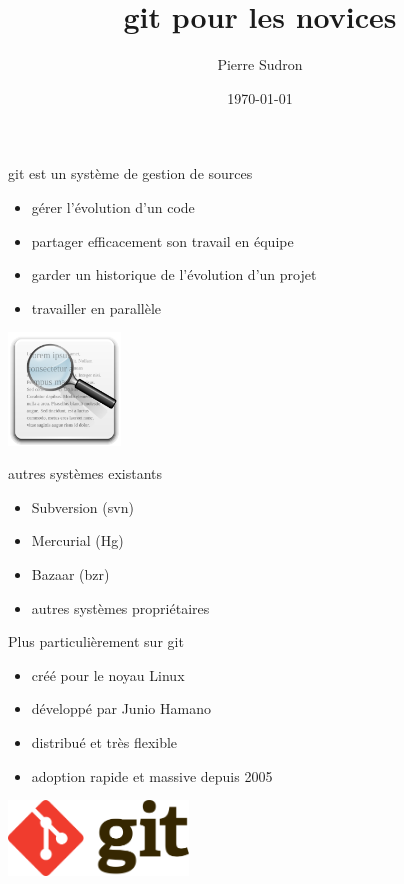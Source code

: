 \documentclass{beamer}
\author{Pierre Sudron}
\title{{\huge git pour les novices}}
\institute{EISTI}
\date{\today}
\begin{document}
\begin{frame}[t,plain]
\titlepage
\end{frame}

\begin{frame}{git est un système de gestion de sources}
	\begin{itemize}
		\item gérer l'évolution d'un code
		\item partager efficacement son travail en équipe
		\item garder un historique de l'évolution d'un projet
		\item travailler en parallèle
	\end{itemize}
	\begin{center}
		\includegraphics[width=3cm]{img/search}
	\end{center}
\end{frame}

\begin{frame}{autres systèmes existants}
	\begin{itemize}
		\item Subversion (svn)
		\item Mercurial (Hg)
		\item Bazaar (bzr)
		\item autres systèmes propriétaires
	\end{itemize}
\end{frame}

\begin{frame}{Plus particulièrement sur git}
	\begin{itemize}
		\item créé pour le noyau Linux
		\item développé par Junio Hamano
		\item distribué et très flexible
		\item adoption rapide et massive depuis 2005
	\end{itemize}
	
	\begin{center}
		\includegraphics[height=2cm]{img/Git-logo}
	\end{center}	
\end{frame}
\end{document}
